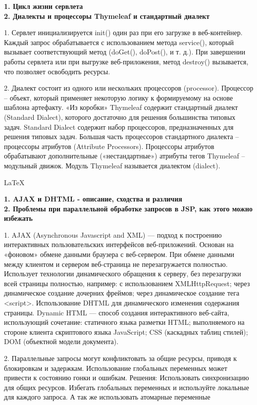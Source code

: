 \documentclass{article}
\begin{document}
\hfill
\begin{minipage}{.3\textwidth}
    \textbf{1. Цикл жизни сервлета}\\
    \textbf{2. Диалекты и процессоры Thymeleaf и стандартный диалект}

1. Сервлет инициализируется init() один раз при его загрузке в веб-контейнер.
Каждый запрос обрабатывается с использованием метода service(), который вызывает соответствующий метод (doGet(), doPost(), и т. д.).
При завершении работы сервлета или при выгрузке веб-приложения, метод destroy() вызывается, что позволяет освободить ресурсы.

2. Диалект состоит из одного или нескольких
процессоров (processor). Процессор – объект, который применяет некоторую логику к формируемому на основе шаблона артефакту. «Из коробки» Thymeleaf содержит стандартный диалект (Standard Dialect), которого достаточно для решения большинства типовых задач. 
Standard Dialect содержит набор процессоров, предназначенных для решения типовых задач.
Большая часть процессоров стандартного диалекта – процессоры атрибутов (Attribute Processors).
Процессоры атрибутов обрабатывают дополнительные («нестандартные») атрибуты тегов
Thymeleaf – модульный движок. Модуль Thymeleaf
называется диалектом (dialect).
\end{minipage}
\newpage
\begin{center}
    \LaTeX
\end{center}
\begin{minipage}{.3\textwidth}
    \textbf{1. AJAX и DHTML - описание, сходства и различия}\\
    \textbf{2. Проблемы при параллельной обработке запросов в JSP, как этого можно избежать}

1. AJAX (Asynchronous Javascript and XML) — подход к построению интерактивных пользовательских интерфейсов веб-приложений. 
Основан на «фоновом» обмене данными браузера с веб-сервером.
При обмене данными между клиентом и сервером веб-страница не перезагружается полностью.
Использует технологии динамического обращения к серверу, без перезагрузки всей страницы полностью, например:
с использованием XMLHttpRequest;
через динамическое создание дочерних фреймов;
через динамическое создание тега <script>.
Использование DHTML для динамического изменения содержания страницы.
Dynamic HTML — способ создания интерактивного веб-сайта, использующий сочетание:
статичного языка разметки HTML;
выполняемого на стороне клиента скриптового языка JavaScript;
CSS (каскадных таблиц стилей);
DOM (объектной модели документа).

2. Параллельные запросы могут конфликтовать за общие ресурсы, приводя к блокировкам и задержкам. Использование глобальных переменных может привести к состоянию гонки и ошибкам.
Решения: Использовать синхронизацию для общих ресурсов. Избегать глобальных переменных и используйте локальные для каждого запроса. А так же использовать атомарные переменные
\end{minipage}
\end{document}
